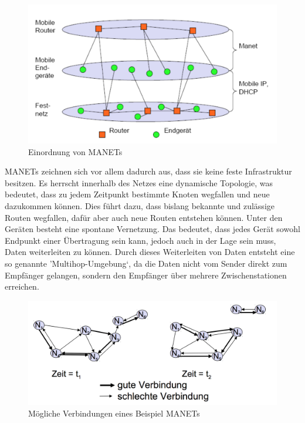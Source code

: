 \begin{figure}[H] 
	\centering
	\includegraphics[scale=0.5]{Bilder/manet}
	\caption{Einordnung von MANETs\cite{d:timm}}
	\label{f:manet}
\end{figure}

MANETs zeichnen sich vor allem dadurch aus, dass sie keine feste Infrastruktur besitzen. Es herrscht innerhalb des Netzes eine dynamische Topologie, was bedeutet, dass zu jedem Zeitpunkt bestimmte Knoten wegfallen und neue dazukommen können. Dies führt dazu, dass bislang bekannte und zulässige Routen wegfallen, dafür aber auch neue Routen entstehen können. Unter den Geräten besteht eine spontane Vernetzung. Das bedeutet, dass jedes Gerät sowohl Endpunkt einer Übertragung sein kann, jedoch auch in der Lage sein muss, Daten weiterleiten zu können. Durch dieses Weiterleiten von Daten entsteht eine so genannte 'Multihop-Umgebung‘, da die Daten nicht vom Sender direkt zum Empfänger gelangen, sondern den Empfänger über mehrere Zwischenstationen erreichen. \\

\begin{figure}[H] 
	\centering
	\includegraphics[scale=0.5]{Bilder/manetconnection}
	\caption{Mögliche Verbindungen eines Beispiel MANETs\cite{d:timm}}
	\label{f:manetconnection}
\end{figure}

